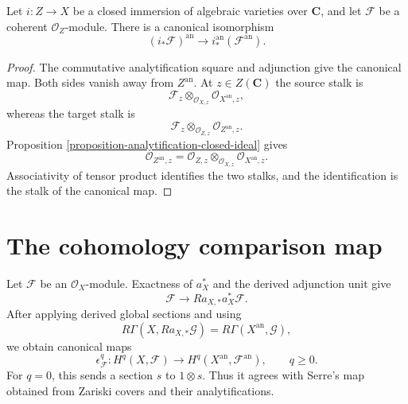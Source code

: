 \begin{lemma}
\label{lemma-analytification-pushforward-closed-immersion}
\begin{reference}
\cite[\S 3, no. 10, Proposition 11]{GAGA}
\end{reference}
Let $i:Z\to X$ be a closed immersion of algebraic varieties over
$\mathbf C$, and let $\mathcal F$ be a coherent $\mathcal O_Z$-module. There
is a canonical isomorphism
$$
(i_*\mathcal F)^{\mathrm{an}}
\longrightarrow i^{\mathrm{an}}_*(\mathcal F^{\mathrm{an}}).
$$
\end{lemma}

\begin{proof}
The commutative analytification square and adjunction give the canonical
map. Both sides vanish away from $Z^{\mathrm{an}}$. At
$z\in Z(\mathbf C)$ the source stalk is
$$
\mathcal F_z\otimes_{\mathcal O_{X,z}}
\mathcal O_{X^{\mathrm{an}},z},
$$
whereas the target stalk is
$$
\mathcal F_z\otimes_{\mathcal O_{Z,z}}
\mathcal O_{Z^{\mathrm{an}},z}.
$$
Proposition \ref{proposition-analytification-closed-ideal} gives
$$
\mathcal O_{Z^{\mathrm{an}},z}
=\mathcal O_{Z,z}\otimes_{\mathcal O_{X,z}}
\mathcal O_{X^{\mathrm{an}},z}.
$$
Associativity of tensor product identifies the two stalks, and the
identification is the stalk of the canonical map.
\end{proof}


\section{The cohomology comparison map}
\label{section-analytification-cohomology-map}

\begin{definition}
\label{construction-analytification-cohomology-map}
\begin{reference}
\cite[\S 3, no. 11]{GAGA}
\end{reference}
Let $\mathcal F$ be an $\mathcal O_X$-module. Exactness of $a_X^*$ and the
derived adjunction unit give
$$
\mathcal F\longrightarrow Ra_{X,*}a_X^*\mathcal F.
$$
After applying derived global sections and using
$$
R\Gamma(X,Ra_{X,*}\mathcal G)
=R\Gamma(X^{\mathrm{an}},\mathcal G),
$$
we obtain canonical maps
$$
\epsilon^q_{\mathcal F}:
H^q(X,\mathcal F)\longrightarrow
H^q(X^{\mathrm{an}},\mathcal F^{\mathrm{an}}),
\qquad q\geq0.
$$
For $q=0$, this sends a section $s$ to $1\otimes s$. Thus it agrees with
Serre's map obtained from Zariski covers and their analytifications.
\end{definition}

